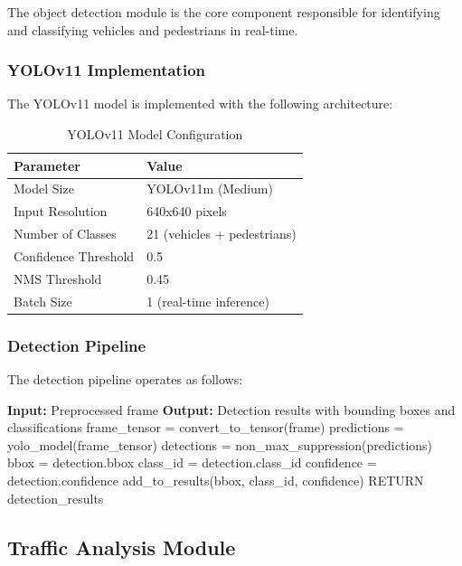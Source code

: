 The object detection module is the core component responsible for identifying and classifying vehicles and pedestrians in real-time.

\subsubsection{YOLOv11 Implementation}

The YOLOv11 model is implemented with the following architecture:

\begin{table}[h]
\centering
\caption{YOLOv11 Model Configuration}
\begin{tabular}{|l|l|}
\hline
\textbf{Parameter} & \textbf{Value} \\
\hline
Model Size & YOLOv11m (Medium) \\
Input Resolution & 640x640 pixels \\
Number of Classes & 21 (vehicles + pedestrians) \\
Confidence Threshold & 0.5 \\
NMS Threshold & 0.45 \\
Batch Size & 1 (real-time inference) \\
\hline
\end{tabular}
\end{table}

\subsubsection{Detection Pipeline}

The detection pipeline operates as follows:

\begin{algorithmic}[1]
\STATE \textbf{Input:} Preprocessed frame
\STATE \textbf{Output:} Detection results with bounding boxes and classifications
\STATE 
\STATE frame\_tensor = convert\_to\_tensor(frame)
\STATE predictions = yolo\_model(frame\_tensor)
\STATE detections = non\_max\_suppression(predictions)
\STATE 
{}
    \STATE bbox = detection.bbox
    \STATE class\_id = detection.class\_id
    \STATE confidence = detection.confidence
    \STATE 
        \STATE add\_to\_results(bbox, class\_id, confidence)
    \ENDIF
\ENDFOR
\STATE 
\STATE RETURN detection\_results
\end{algorithmic}

\subsection{Traffic Analysis Module}


